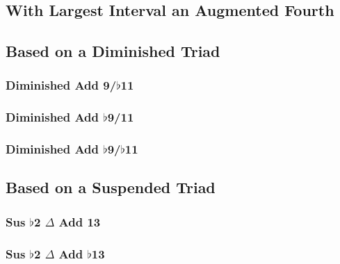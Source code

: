 \documentclass[english]{./gbook}
\begin{document}
\begin{large}
\section{With Largest Interval an Augmented Fourth}

\subsection{Based on a Diminished Triad}

\subsubsection{Diminished Add 9/$\flat$11}

\subsubsection{Diminished Add $\flat$9/11}

\subsubsection{Diminished Add $\flat$9/$\flat$11}


\subsection{Based on a Suspended Triad}

\subsubsection{Sus $\flat$2 $\Delta$ Add 13}

\subsubsection{Sus $\flat$2 $\Delta$ Add $\flat$13}


\end{large}
\end{document}
